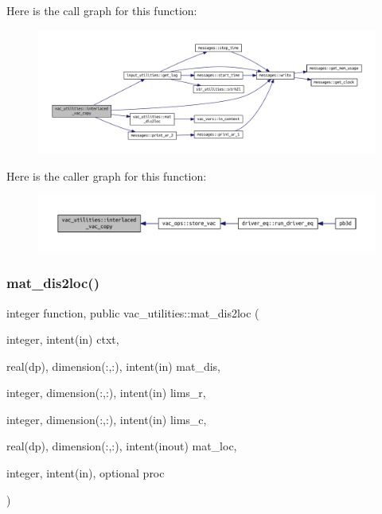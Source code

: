Here is the call graph for this function\+:\nopagebreak
\begin{figure}[H]
\begin{center}
\leavevmode
\includegraphics[width=350pt]{namespacevac__utilities_a8e7889688701f6ac2fd2c60cdee2b96a_cgraph}
\end{center}
\end{figure}
Here is the caller graph for this function\+:\nopagebreak
\begin{figure}[H]
\begin{center}
\leavevmode
\includegraphics[width=350pt]{namespacevac__utilities_a8e7889688701f6ac2fd2c60cdee2b96a_icgraph}
\end{center}
\end{figure}
\mbox{\label{namespacevac__utilities_ae70e8a1fc132ba79a9a4f49f4944a352}} 
\subsubsection{\texorpdfstring{mat\+\_\+dis2loc()}{mat\_dis2loc()}}
{\footnotesize\ttfamily integer function, public vac\+\_\+utilities\+::mat\+\_\+dis2loc (\begin{DoxyParamCaption}\item[{integer, intent(in)}]{ctxt,  }\item[{real(dp), dimension(\+:,\+:), intent(in)}]{mat\+\_\+dis,  }\item[{integer, dimension(\+:,\+:), intent(in)}]{lims\+\_\+r,  }\item[{integer, dimension(\+:,\+:), intent(in)}]{lims\+\_\+c,  }\item[{real(dp), dimension(\+:,\+:), intent(inout)}]{mat\+\_\+loc,  }\item[{integer, intent(in), optional}]{proc }\end{DoxyParamCaption})}



